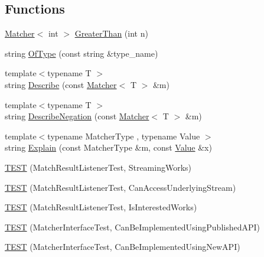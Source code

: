 \subsection*{Functions}
\begin{DoxyCompactItemize}
\item 
\hyperlink{classtesting_1_1_matcher}{Matcher}$<$ int $>$ \hyperlink{namespacetesting_1_1gmock__matchers__test_a8cf8614a7c9adc8fb00e8af04895f97c}{Greater\+Than} (int n)
\item 
string \hyperlink{namespacetesting_1_1gmock__matchers__test_a5d48d2ef7ca374de369c5f0a30e32343}{Of\+Type} (const string \&type\+\_\+name)
\item 
{\footnotesize template$<$typename T $>$ }\\string \hyperlink{namespacetesting_1_1gmock__matchers__test_a36ae44e4f6c8e9fe3fe9162132503717}{Describe} (const \hyperlink{classtesting_1_1_matcher}{Matcher}$<$ T $>$ \&m)
\item 
{\footnotesize template$<$typename T $>$ }\\string \hyperlink{namespacetesting_1_1gmock__matchers__test_afbc8022da5a58aa467ec414ab3e90908}{Describe\+Negation} (const \hyperlink{classtesting_1_1_matcher}{Matcher}$<$ T $>$ \&m)
\item 
{\footnotesize template$<$typename Matcher\+Type , typename Value $>$ }\\string \hyperlink{namespacetesting_1_1gmock__matchers__test_a6215aeb6213a03f4233924ef1c74d968}{Explain} (const Matcher\+Type \&m, const \hyperlink{namespacetesting_ae44c50a3a7f0a46f05c8a0b0592b4a62}{Value} \&x)
\item 
\hyperlink{namespacetesting_1_1gmock__matchers__test_a7bc21ec910c3861034d1336fecfcc260}{T\+E\+ST} (Match\+Result\+Listener\+Test, Streaming\+Works)
\item 
\hyperlink{namespacetesting_1_1gmock__matchers__test_abc02b215e80c57464c83abdf297b9db7}{T\+E\+ST} (Match\+Result\+Listener\+Test, Can\+Access\+Underlying\+Stream)
\item 
\hyperlink{namespacetesting_1_1gmock__matchers__test_ac7ee3826ca24c20fa2a8b388c72eedb2}{T\+E\+ST} (Match\+Result\+Listener\+Test, Is\+Interested\+Works)
\item 
\hyperlink{namespacetesting_1_1gmock__matchers__test_a2d73acaddb6b28a827ce0e475ffc9cde}{T\+E\+ST} (Matcher\+Interface\+Test, Can\+Be\+Implemented\+Using\+Published\+A\+PI)
\item 
\hyperlink{namespacetesting_1_1gmock__matchers__test_ad212c5ac3ef7a102a6b1712e40e06a1e}{T\+E\+ST} (Matcher\+Interface\+Test, Can\+Be\+Implemented\+Using\+New\+A\+PI)

\end{DoxyCompactItemize}
